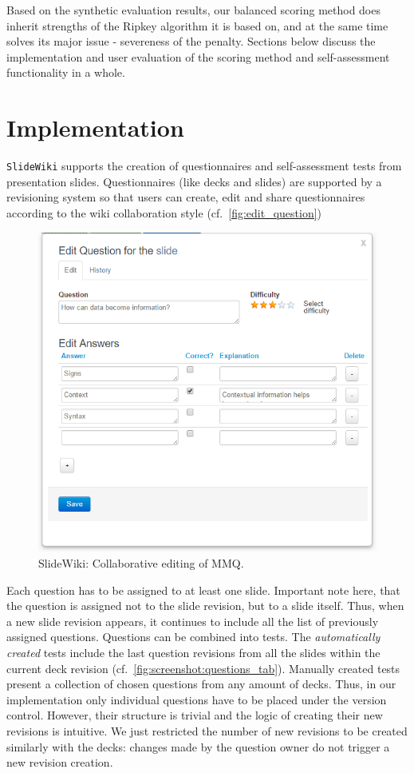 \documentclass[PhD, Submit, ngerman,UKenglish,table]{scrbook}
\begin{document}
Based on the synthetic evaluation results, our balanced scoring method does inherit strengths of the Ripkey algorithm it is based on, and at the same time solves its major issue - severeness of the penalty.
Sections below discuss the implementation and user evaluation of the scoring method and self-assessment functionality in a whole.

\section{Implementation}

\texttt{SlideWiki} supports the creation of questionnaires and self-assessment tests from presentation slides.
Questionnaires (like decks and slides) are supported by a revisioning system so that users can create, edit and share questionnaires according to the wiki collaboration style (cf.~\autoref{fig:edit_question})

\begin{figure}[h!]
	\centering
		\includegraphics[width=.9\columnwidth]{images/questions_edit.png}
	\caption{SlideWiki: Collaborative editing of MMQ.}
	\label{fig:edit_question}
\end{figure}


Each question has to be assigned to at least one slide.
Important note here, that the question is assigned not to the slide revision, but to a slide itself.
Thus, when a new slide revision appears, it continues to include all the list of previously assigned questions.
Questions can be combined into tests.
The \textit{automatically created} tests include the last question revisions from all the slides within the current deck revision (cf.~\autoref{fig:screenshot:questions_tab}).
Manually created tests present a collection of chosen questions from any amount of decks.
Thus, in our implementation only individual questions have to be placed under the version control.
However, their structure is trivial and the logic of creating their new revisions is intuitive.
We just restricted the number of new revisions to be created similarly with the decks: changes made by the question owner do not trigger a new revision creation.
\end{document}
